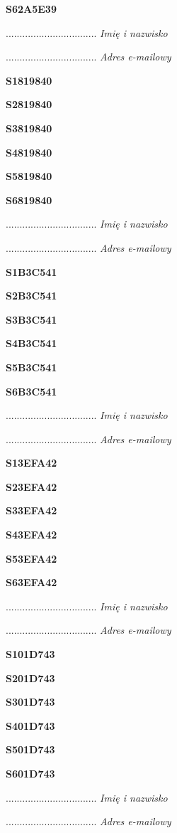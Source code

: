 \Large \textbf{S62A5E39}

.................................
\textit{Imię i nazwisko}

.................................
\textit{Adres e-mailowy}

\Large \textbf{S1819840}

\Large \textbf{S2819840}

\Large \textbf{S3819840}

\Large \textbf{S4819840}

\Large \textbf{S5819840}

\Large \textbf{S6819840}

.................................
\textit{Imię i nazwisko}

.................................
\textit{Adres e-mailowy}

\Large \textbf{S1B3C541}

\Large \textbf{S2B3C541}

\Large \textbf{S3B3C541}

\Large \textbf{S4B3C541}

\Large \textbf{S5B3C541}

\Large \textbf{S6B3C541}

.................................
\textit{Imię i nazwisko}

.................................
\textit{Adres e-mailowy}

\Large \textbf{S13EFA42}

\Large \textbf{S23EFA42}

\Large \textbf{S33EFA42}

\Large \textbf{S43EFA42}

\Large \textbf{S53EFA42}

\Large \textbf{S63EFA42}

.................................
\textit{Imię i nazwisko}

.................................
\textit{Adres e-mailowy}

\Large \textbf{S101D743}

\Large \textbf{S201D743}

\Large \textbf{S301D743}

\Large \textbf{S401D743}

\Large \textbf{S501D743}

\Large \textbf{S601D743}

.................................
\textit{Imię i nazwisko}

.................................
\textit{Adres e-mailowy}

